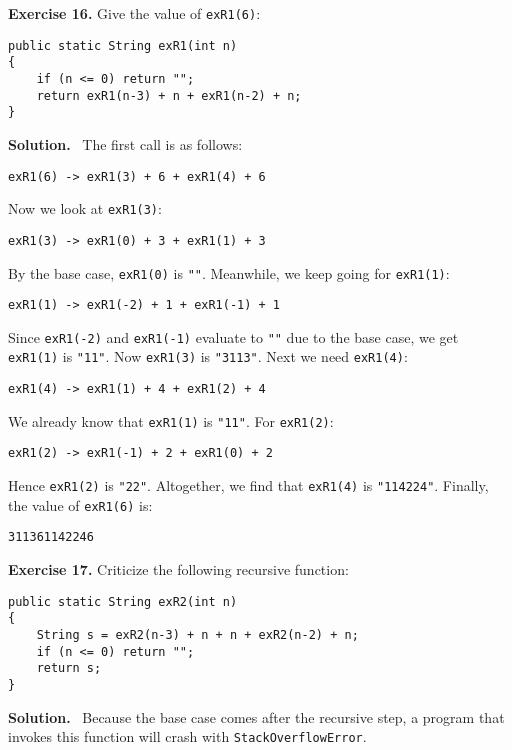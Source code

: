 \documentclass[12pt, a4paper]{article}
\newenvironment{ex}[2][Exercise]
{\par\medskip\noindent \textbf{#1 #2.}}
{\medskip}
\newenvironment{sol}[1][Solution]
{\par\medskip\noindent \textbf{#1.} }
{\medskip}
\begin{document}
	\begin{ex}{16}
		Give the value of \texttt{exR1(6)}:
		\begin{lstlisting}
public static String exR1(int n)
{
	if (n <= 0) return "";
	return exR1(n-3) + n + exR1(n-2) + n;
}
		\end{lstlisting}
	\end{ex}
	\begin{sol}
		\
			The first call is as follows:
		\begin{lstlisting}[language={}]
exR1(6) -> exR1(3) + 6 + exR1(4) + 6
		\end{lstlisting}
		Now we look at \texttt{exR1(3)}:
		\begin{lstlisting}[language={}]
exR1(3) -> exR1(0) + 3 + exR1(1) + 3
		\end{lstlisting}
		By the base case, \texttt{exR1(0)} is \texttt{""}. Meanwhile, we keep going for \texttt{exR1(1)}:
		\begin{lstlisting}[language={}]
exR1(1) -> exR1(-2) + 1 + exR1(-1) + 1
		\end{lstlisting}
		Since \texttt{exR1(-2)} and \texttt{exR1(-1)} evaluate to \texttt{""} due to the
		base case, we get \texttt{exR1(1)} is \texttt{"11"}. Now \texttt{exR1(3)} is \texttt{"3113"}.
		Next we need \texttt{exR1(4)}:
		\begin{lstlisting}[language={}]
exR1(4) -> exR1(1) + 4 + exR1(2) + 4
		\end{lstlisting}
		We already know that \texttt{exR1(1)} is \texttt{"11"}. For \texttt{exR1(2)}:
		\begin{lstlisting}[language={}]
exR1(2) -> exR1(-1) + 2 + exR1(0) + 2
		\end{lstlisting}
		Hence \texttt{exR1(2)} is \texttt{"22"}. Altogether, we find that \texttt{exR1(4)} is
		\texttt{"114224"}. Finally, the value of \texttt{exR1(6)} is:
		\begin{lstlisting}[language={}]
311361142246
		\end{lstlisting}
	\end{sol}
	\begin{ex}{17}
		Criticize the following recursive function:
		\begin{lstlisting}
public static String exR2(int n)
{
	String s = exR2(n-3) + n + n + exR2(n-2) + n;
	if (n <= 0) return "";
	return s;
}
		\end{lstlisting}
	\end{ex}
	\begin{sol}
		\
		Because the base case comes after the recursive step, a program that invokes this
		function will crash with \texttt{StackOverflowError}.
	\end{sol}
\end{document}
